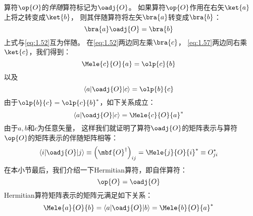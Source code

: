 算符$\op{O}$的\emph{伴随}算符标记为$\oadj{O}$。
如果算符$\op{O}$作用在右矢$\ket{a}$上将之转变成$\ket{b}$，
则其伴随算符将左矢$\bra{a}$转变成$\bra{b}$：
\begin{equation}
 \bra{a}\oadj{O} = \bra{b}
 \label{eq:1.57}
\end{equation}
上式与\autoref{eq:1.52}互为伴随。
在\autoref{eq:1.52}两边同左乘$\bra{c}$，
\autoref{eq:1.57}两边同右乘$\ket{c}$，我们得到：
\[
\Mele{c}{O}{a} = \olp{c}{b}
\]
以及
\[
\left\langle a\middle\vert \oadj{O}\middle\vert c\right\rangle = \olp{b}{c}
\]
由于$\olp{b}{c} = {\olp{c}{b}}^\ast$，如下关系成立：
\begin{equation}
 \left\langle a\middle\vert \oadj{O}\middle\vert c\right\rangle = {\Mele{c}{O}{a}}^\ast
 \label{eq:1.58}
\end{equation}
由于$a, b$和$c$为任意矢量，
这样我们就证明了算符$\oadj{O}$的矩阵表示与算符$\op{O}$的矩阵表示的伴随矩阵相等：
\begin{equation}
 \left\langle i\middle\vert \oadj{O}\middle\vert j\right\rangle \equiv \left(\mbf{O}^\dagger\right)_{ij} = {\Mele{j}{O}{i}}^\ast \equiv O_{ji}^\ast
 \label{eq:1.59}
\end{equation}
在本小节最后，我们介绍一下Hermitian算符，即自伴算符：
\begin{equation}
 \op{O} = \oadj{O}
 \label{eq:1.60}
\end{equation}
Hermitian算符矩阵表示的矩阵元满足如下关系：
\begin{equation}
 \Mele{a}{O}{b} = \left\langle a\middle\vert \oadj{O}\middle\vert b\right\rangle = {\Mele{b}{O}{a}}^\ast
 \label{eq:1.61}
\end{equation}


